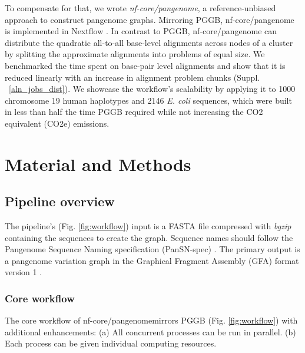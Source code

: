 \documentclass{bioinfo}
\theoremstyle{definition}
\begin{document}
	To compensate for that, we wrote \textit{nf-core/pangenome}, a reference-unbiased approach to construct pangenome graphs. 
	Mirroring PGGB, nf-core/pangenome is implemented in Nextflow \citep{DiTommaso2017}.
	In contrast to PGGB, nf-core/pangenome can distribute the quadratic all-to-all base-level alignments across nodes of a cluster by splitting the approximate alignments into problems of equal size. 
	We benchmarked the time spent on base-pair level alignments and show that it is reduced linearly with an increase in alignment problem chunks (Suppl. ~\ref{aln_jobs_dist}). 
	We showcase the workflow’s scalability by applying it to 1000 chromosome 19 human haplotypes and 2146 \textit{E. coli} sequences, which were built in less than half the time PGGB required while not increasing the CO2 equivalent (CO2e) emissions.
	\vspace{-0.6cm}
	\section{Material and Methods}
	
	\subsection{Pipeline overview}
	The pipeline’s (Fig. \ref{fig:workflow}) input is a FASTA file compressed with \textit{bgzip} \citep{Li2009} containing the sequences to create the graph. 
	Sequence names should follow the Pangenome Sequence Naming specification (PanSN-spec) \citep{pansn-spec}. 
	The primary output is a pangenome variation graph \citep{Garrison:2018} in the Graphical Fragment Assembly (GFA) format version 1 \citep{GFA}.
	
	

	\subsubsection{Core workflow}
	
	The core workflow of nf-core/pangenomemirrors PGGB (Fig. \ref{fig:workflow}) with additional enhancements: (a) All concurrent processes can be run in parallel. (b) Each process can be given individual computing resources.
	
\end{document}
